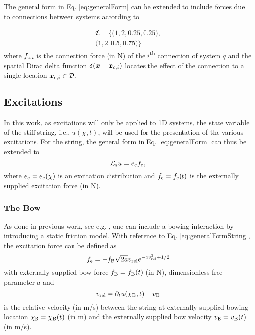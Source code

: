 \documentclass{article}
\begin{document}
The general form in Eq. \eqref{eq:generalForm} can be extended to include forces due to connections between systems according to


\begin{equation}
\begin{aligned}
    \mathfrak{C} = \Big\{\big(1, 2, 0.25, 0.25\big), \\
    \big(1, 2, 0.5, 0.75\big)\Big\}
\end{aligned}
\end{equation}
where $f_{\text{c}, i}$ is the connection force (in N) of the $i$\textsuperscript{th} connection of system $q$ and the spatial Dirac delta function $\delta(\boldsymbol{x}-\boldsymbol{x}_{\text{c}, i})$ locates the effect of the connection to a single location $\boldsymbol{x}_{\text{c}, i}\in \mathcal{D}$.
  
  
\subsection{Excitations}
In this work, as excitations will only be applied to 1D systems, the state variable of the stiff string, i.e., $u(\chi, t)$, will be used for the presentation of the various excitations. For the string, the general form in Eq. \eqref{eq:generalForm}
can thus be extended to 
\begin{equation}\label{eq:generalFormString}
    \mathcal{L}_{\text{s}} u = e_{\text{e}} f_{\text{e}},
\end{equation}
where $e_{\text{e}} = e_{\text{e}}(\chi)$ is an excitation distribution and $f_{\text{e}} = f_{\text{e}}(t)$ is the externally supplied excitation force (in N).

\subsubsection{The Bow}
As done in previous work, see e.g. \cite{Willemsen2019}, one can include a bowing interaction by introducing a static friction model. With reference to Eq. \eqref{eq:generalFormString}, the excitation force can be defined as \cite{theBible}
\begin{equation}
    f_\text{e} = - f_{\text{B}}\sqrt{2a}v_\text{rel} e^{-av_\text{rel}^2+1/2} 
\end{equation}
with externally supplied bow force $f_{\text{B}} = f_{\text{B}}(t)$ (in N), dimensionless free parameter $a$ and 
\begin{equation}
    v_\text{rel} = \partial_t u(\chi_{\text{B}}, t) - v_{\text{B}}
\end{equation}
is the relative velocity (in m/s) between the string at externally supplied bowing location $\chi_{\text{B}} = \chi_{\text{B}}(t)$ (in m) and the externally supplied bow velocity $v_{\text{B}} = v_{\text{B}}(t)$ (in m/s).
\end{document}
